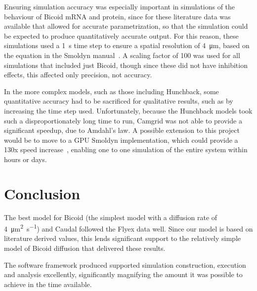 \documentclass[11pt,a4paper,twocolumn]{article}
\begin{document}
Ensuring simulation accuracy was especially important in simulations of the behaviour of Bicoid mRNA and protein, since for these literature data was available that allowed for accurate parametrization, so that the simulation could be expected to produce quantitatively accurate output. For this reason, these simulations used a \SI{1}{s} time step to ensure a spatial resolution of \SI{4}{\micro\metre}, based on the equation in the Smoldyn manual~\cite{Andrews2011}. A scaling factor of \num{100} was used for all simulations that included just Bicoid, though since these did not have inhibition effects, this affected only precision, not accuracy.

In the more complex models, such as those including Hunchback, some quantitative accuracy had to be sacrificed for qualitative results, such as by increasing the time step used. Unfortunately, because the Hunchback models took such a disproportionately long time to run, Camgrid was not able to provide a significant speedup, due to Amdahl’s law. A possible extension to this project would be to move to a GPU Smoldyn implementation, which could provide a 130x  speed increase~\cite{Dematte2010}, enabling one to one simulation of the entire system within hours or days.

\section{Conclusion}
The best model for Bicoid (the simplest model with a diffusion rate of \SI{4}{\micro\metre\squared\per\second}) and Caudal followed the Flyex data well. Since our model is based on literature derived values, this lends significant support to the relatively simple model of Bicoid diffusion that delivered these results. 

The software framework produced supported simulation construction, execution and analysis excellently, significantly magnifying the amount it was possible to achieve in the time available.

\nocite{*}
\pagebreak[4]


\end{document}
